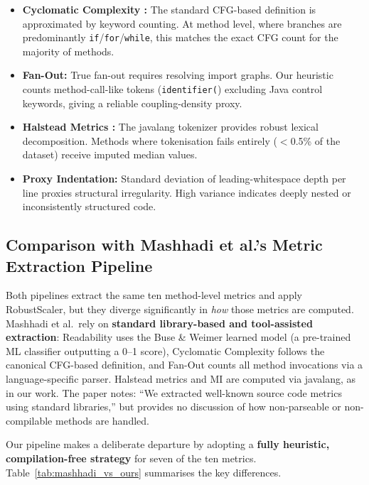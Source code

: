 \documentclass[12pt, a4paper]{report}
\begin{document}
\begin{itemize}
  \item \textbf{Cyclomatic Complexity \cite{mccabe}:} The standard CFG-based definition is approximated by keyword counting. At method level, where branches are predominantly \texttt{if}/\texttt{for}/\texttt{while}, this matches the exact CFG count for the majority of methods.
  \item \textbf{Fan-Out:} True fan-out requires resolving import graphs. Our heuristic counts method-call-like tokens (\texttt{identifier(}) excluding Java control keywords, giving a reliable coupling-density proxy.
  \item \textbf{Halstead Metrics \cite{halstead}:} The javalang tokenizer provides robust lexical decomposition. Methods where tokenisation fails entirely ($<$0.5\% of the dataset) receive imputed median values.
  \item \textbf{Proxy Indentation:} Standard deviation of leading-whitespace depth per line proxies structural irregularity. High variance indicates deeply nested or inconsistently structured code.
\end{itemize}

\subsection{Comparison with Mashhadi et al.'s Metric Extraction Pipeline}
\label{sec:mashhadi_comparison}

Both pipelines extract the same ten method-level metrics and apply RobustScaler, but they diverge significantly in \textit{how} those metrics are computed. Mashhadi et al.\ rely on \textbf{standard library-based and tool-assisted extraction}: Readability uses the Buse \& Weimer learned model \cite{buse2009} (a pre-trained ML classifier outputting a 0--1 score), Cyclomatic Complexity follows the canonical CFG-based definition, and Fan-Out counts all method invocations via a language-specific parser. Halstead metrics and MI are computed via javalang, as in our work. The paper notes: ``We extracted well-known source code metrics using standard libraries,'' but provides no discussion of how non-parseable or non-compilable methods are handled.

Our pipeline makes a deliberate departure by adopting a \textbf{fully heuristic, compilation-free strategy} for seven of the ten metrics. Table~\ref{tab:mashhadi_vs_ours} summarises the key differences.
\end{document}
